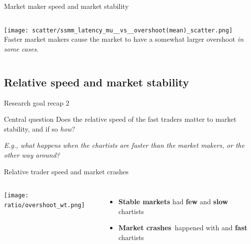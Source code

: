 \documentclass[14pt]{beamer}
\begin{document}
\begin{frame}{Market maker speed and market stability}
\begin{columns}[c]
\column{2in}
\texttt{[image: scatter/ssmm\_latency\_mu\_\_vs\_\_overshoot(mean)\_scatter.png]}
\column{1.5in}
\color{red} Faster market makers \color{black} cause the market to have a \color{red} somewhat \color{black} larger overshoot \textit{in some cases}.
\end{columns}
\end{frame}


\subsection{Relative speed and market stability}
\begin{frame}
\tableofcontents[currentsubsection]
\end{frame}

\begin{frame}{Research goal recap 2}
\begin{block}{Central question}
Does the \color{red} relative speed \color{black} of the fast traders matter to market stability, and if so \textit{how}?
\end{block}
\vspace{0.2in}
\pause
\textit{E.g., what happens when the chartists are faster than the market makers, or the other way around?}
\end{frame}


\begin{frame}{Relative trader speed and market crashes}
\begin{columns}
\column{1.7in}
\texttt{[image: ratio/overshoot\_wt.png]}
\column{1.7in}
\begin{itemize}
\item \color{blue} \textbf{Stable markets} \color{black} had \textbf{few} and \textbf{slow} chartists
\item \color{red} \textbf{Market crashes}\color{black}\ happened with  and \textbf{fast} chartists
\end{itemize}
\end{columns}
\end{frame}
\end{document}
